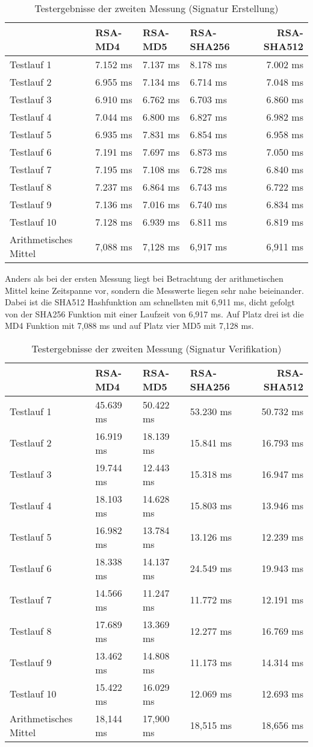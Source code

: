 \begin{table}[H]
	\begin{tabularx}{\textwidth}{p{}|X|X|X|r}
		& RSA-MD4 & RSA-MD5 & RSA-SHA256 & RSA-SHA512\\
		\hline
		Testlauf 1& 7.152 ms& 7.137 ms& 8.178 ms& 7.002 ms\\
		Testlauf 2& 6.955 ms& 7.134 ms& 6.714 ms& 7.048 ms\\
		Testlauf 3& 6.910 ms& 6.762 ms& 6.703 ms& 6.860 ms\\
		Testlauf 4& 7.044 ms& 6.800 ms& 6.827 ms& 6.982 ms\\
		Testlauf 5& 6.935 ms& 7.831 ms& 6.854 ms& 6.958 ms\\
		Testlauf 6& 7.191 ms& 7.697 ms& 6.873 ms& 7.050 ms\\
		Testlauf 7& 7.195 ms& 7.108 ms& 6.728 ms& 6.840 ms\\
		Testlauf 8& 7.237 ms& 6.864 ms& 6.743 ms& 6.722 ms\\
		Testlauf 9& 7.136 ms& 7.016 ms& 6.740 ms& 6.834 ms\\
		Testlauf 10& 7.128 ms& 6.939 ms& 6.811 ms& 6.819 ms\\
		\hline
		Arithmetisches Mittel& 7,088 ms& 7,128 ms& 6,917 ms& 6,911 ms
	\end{tabularx}
	\caption{Testergebnisse der zweiten Messung (Signatur Erstellung)}
\end{table}
Anders als bei der ersten Messung liegt bei Betrachtung der arithmetischen Mittel keine Zeitspanne vor, sondern die Messwerte liegen sehr nahe beieinander. Dabei ist die SHA512 Hashfunktion am schnellsten mit 6,911 ms, dicht gefolgt von der SHA256 Funktion mit einer Laufzeit von 6,917 ms. Auf Platz drei ist die MD4 Funktion mit 7,088 ms und auf Platz vier MD5 mit 7,128 ms.\\
\begin{table}[H]
	\begin{tabularx}{\textwidth}{p{}|X|X|X|r}
		& RSA-MD4 & RSA-MD5 & RSA-SHA256 & RSA-SHA512\\
		\hline
		Testlauf 1& 45.639 ms& 50.422 ms& 53.230 ms& 50.732 ms\\
		Testlauf 2& 16.919 ms& 18.139 ms& 15.841 ms& 16.793 ms\\
		Testlauf 3& 19.744 ms& 12.443 ms& 15.318 ms& 16.947 ms\\
		Testlauf 4& 18.103 ms& 14.628 ms& 15.803 ms& 13.946 ms\\
		Testlauf 5& 16.982 ms& 13.784 ms& 13.126 ms& 12.239 ms\\
		Testlauf 6& 18.338 ms& 14.137 ms& 24.549 ms& 19.943 ms\\
		Testlauf 7& 14.566 ms& 11.247 ms& 11.772 ms& 12.191 ms\\
		Testlauf 8& 17.689 ms& 13.369 ms& 12.277 ms& 16.769 ms\\
		Testlauf 9& 13.462 ms& 14.808 ms& 11.173 ms& 14.314 ms\\
		Testlauf 10& 15.422 ms& 16.029 ms& 12.069 ms& 12.693 ms\\
		\hline
		Arithmetisches Mittel& 18,144 ms& 17,900 ms& 18,515 ms& 18,656 ms
	\end{tabularx}
	\caption{Testergebnisse der zweiten Messung (Signatur Verifikation)}
\end{table}

